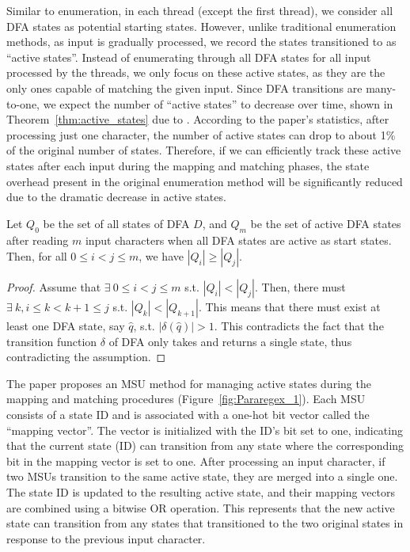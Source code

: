 \documentclass[sigconf]{acmart}
\begin{document}
Similar to enumeration, in each thread (except the first thread), we consider all DFA states as potential starting states. However, unlike traditional enumeration methods, as input is gradually processed, we record the states transitioned to as ``active states''. Instead of enumerating through all DFA states for all input processed by the threads, we only focus on these active states, as they are the only ones capable of matching the given input. Since DFA transitions are many-to-one, we expect the number of ``active states'' to decrease over time, shown in Theorem~\ref{thm:active_states} due to \cite{pararegex}. According to the paper's statistics, after processing just one character, the number of active states can drop to about 1\% of the original number of states. Therefore, if we can efficiently track these active states after each input during the mapping and matching phases, the state overhead present in the original enumeration method will be significantly reduced due to the dramatic decrease in active states.

\begin{theorem}
	Let $Q_0$ be the set of all states of DFA $D$, and $Q_m$ be the set of active DFA states after reading $m$ input characters when all DFA states are active as start states. Then, for all $0 \leq i < j \leq m$, we have $|Q_i| \geq |Q_j|$.
	\label{thm:active_states}
\end{theorem}

\begin{proof}
	Assume that $\exists\ 0 \leq i < j \leq m$ s.t. $|Q_i| < |Q_j|$. Then, there must $\exists\ k, i \leq k < k+1 \leq j$ s.t. $|Q_k| < |Q_{k+1}|$. This means that there must exist at least one DFA state, say $\hat{q}$, s.t. $|\delta (\hat{q})| > 1$. This contradicts the fact that the transition function $\delta$ of DFA only takes and returns a single state, thus contradicting the assumption.
\end{proof}

The paper proposes an MSU method for managing active states during the mapping and matching procedures (Figure~\ref{fig:Pararegex_1}). Each MSU consists of a state ID and is associated with a one-hot bit vector called the ``mapping vector''. The vector is initialized with the ID's bit set to one, indicating that the current state (ID) can transition from any state where the corresponding bit in the mapping vector is set to one. After processing an input character, if two MSUs transition to the same active state, they are merged into a single one. The state ID is updated to the resulting active state, and their mapping vectors are combined using a bitwise OR operation. This represents that the new active state can transition from any states that transitioned to the two original states in response to the previous input character.
\end{document}

